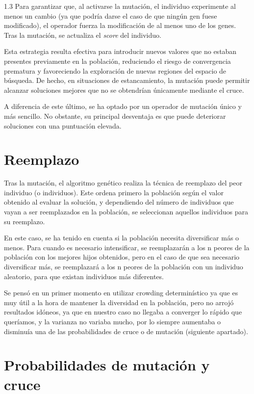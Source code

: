 \documentclass{article}
\begin{document}
\begin{spacing}{1.3}
Para garantizar que, al activarse la mutación, 
el individuo experimente al menos un cambio (ya que podría darse el caso de que ningún gen fuese modificado),
 el operador fuerza la modificación de al menos uno de los genes. Tras la mutación, 
 se actualiza el \textit{score} del individuo.

Esta estrategia resulta efectiva para introducir nuevos valores que no 
estaban presentes previamente en la población, reduciendo el riesgo de convergencia prematura y 
favoreciendo la exploración de nuevas regiones del espacio de búsqueda. De hecho, en situaciones de 
estancamiento, la mutación puede permitir alcanzar soluciones mejores que no se obtendrían únicamente mediante el cruce.

A diferencia de este último, se ha optado por un operador de mutación único y más sencillo. 
No obstante, su principal desventaja es que puede deteriorar soluciones con una puntuación elevada.


\section{Reemplazo}

Tras la mutación, el algoritmo genético realiza la técnica de reemplazo del peor individuo (o individuos).
Este ordena primero la población según el valor obtenido al evaluar la solución, y dependiendo del 
número de individuos que vayan a ser reemplazados en la población, se seleccionan aquellos individuos
para su reemplazo.\newline 

En este caso, se ha tenido en cuenta si la población necesita diversificar más o menos. Para
cuando es necesario intensificar, se reemplazarán a los n peores de la población con los mejores 
hijos obtenidos, pero en el caso de que sea necesario diversificar más, se reemplazará a los n peores
de la población con un individuo aleatorio, para que existan individuos más diferentes.\newline

Se pensó en un primer momento en utilizar crowding determinístico ya que es muy útil a la hora de mantener la diversidad en la población, 
pero no arrojó resultados idóneos, ya que en nuestro caso no llegaba a converger lo rápido que queríamos, y la varianza
no variaba mucho, por lo siempre aumentaba o disminuía una de las probabilidades de cruce o de mutación 
(siguiente apartado).

\section{Probabilidades de mutación y cruce}


\end{spacing}
\end{document}

